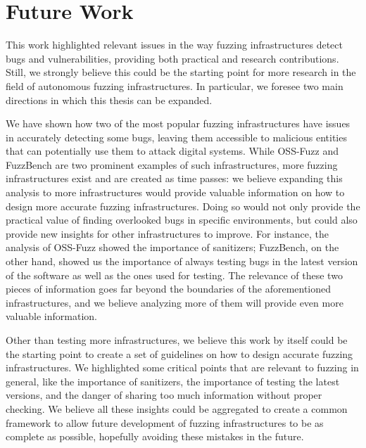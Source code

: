 \newpage
\section{Future Work}
This work highlighted relevant issues in the way fuzzing infrastructures detect bugs and vulnerabilities, providing both practical and research contributions. Still, we strongly believe this could be the starting point for more research in the field of autonomous fuzzing infrastructures. In particular, we foresee two main directions in which this thesis can be expanded.

We have shown how two of the most popular fuzzing infrastructures have issues in accurately detecting some bugs, leaving them accessible to malicious entities that can potentially use them to attack digital systems. While OSS-Fuzz and FuzzBench are two prominent examples of such infrastructures, more fuzzing infrastructures exist and are created as time passes: we believe expanding this analysis to more infrastructures would provide valuable information on how to design more accurate fuzzing infrastructures. Doing so would not only provide the practical value of finding overlooked bugs in specific environments, but could also provide new insights for other infrastructures to improve. For instance, the analysis of OSS-Fuzz showed the importance of sanitizers; FuzzBench, on the other hand, showed us the importance of always testing bugs in the latest version of the software as well as the ones used for testing. The relevance of these two pieces of information goes far beyond the boundaries of the aforementioned infrastructures, and we believe analyzing more of them will provide even more valuable information.

Other than testing more infrastructures, we believe this work by itself could be the starting point to create a set of guidelines on how to design accurate fuzzing infrastructures. We highlighted some critical points that are relevant to fuzzing in general, like the importance of sanitizers, the importance of testing the latest versions, and the danger of sharing too much information without proper checking. We believe all these insights could be aggregated to create a common framework to allow future development of fuzzing infrastructures to be as complete as possible, hopefully avoiding these mistakes in the future.